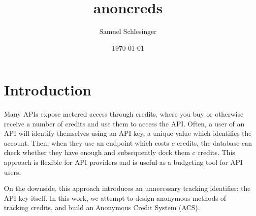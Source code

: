 \documentclass{article}
\title{anoncreds}
\author{Samuel Schlesinger}
\date{\today}
\begin{document}
\maketitle

\section{Introduction}

\paragraph*{}

Many APIs expose metered access through credits, where you buy or otherwise
receive a number of credits and use them to access the API. Often, a user of an
API will identify themselves using an API key, a unique value which identifies
the account. Then, when they use an endpoint which costs $c$ credits, the
database can check whether they have enough and subsequently dock them $c$
credits. This approach is flexible for API providers and is useful as a
budgeting tool for API users.

On the downside, this approach introduces an unnecessary tracking identifier:
the API key itself. In this work, we attempt to design anonymous methods of
tracking credits, and build an Anonymous Credit System (ACS).
\end{document}
